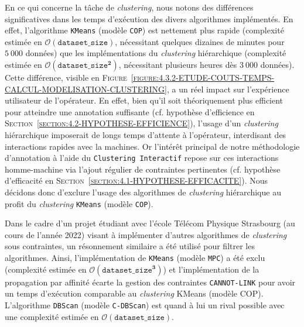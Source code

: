 			En ce qui concerne la tâche de \textit{clustering}, nous notons des différences significatives dans les temps d'exécution des divers algorithmes implémentés.
			En effet, l'algorithme \texttt{KMeans} (modèle \texttt{COP}) est nettement plus rapide (complexité estimée en $ \mathcal{O}(\texttt{dataset\_size}) $, nécessitant quelques dizaines de minutes pour $5~000$ données) que les implémentations du \textit{clustering} hiérarchique (complexité estimée en $ \mathcal{O}(\texttt{dataset\_size}^{\textbf{2}}) $, nécessitant plusieurs heures dès $3~000$ données).
			Cette différence, visible en \textsc{Figure~\ref{figure:4.3.2-ETUDE-COUTS-TEMPS-CALCUL-MODELISATION-CLUSTERING}}, a un réel impact sur l'expérience utilisateur de l'opérateur.
			En effet, bien qu'il soit théoriquement plus efficient pour atteindre une annotation suffisante (cf. hypothèse d'efficience en \textsc{Section~\ref{section:4.2-HYPOTHESE-EFFICIENCE}}), l'usage d'un \textit{clustering} hiérarchique imposerait de longs temps d'attente à l'opérateur, interdisant des interactions rapides avec la machines.
			Or l'intérêt principal de notre méthodologie d'annotation à l'aide du \texttt{Clustering Interactif} repose sur ces interactions homme-machine via l'ajout régulier de contraintes pertinentes (cf. hypothèse d'efficacité en \textsc{Section~\ref{section:4.1-HYPOTHESE-EFFICACITE}}).
			Nous décidons donc d'exclure l'usage des algorithmes de \textit{clustering} hiérarchique au profit du \textit{clustering} \texttt{KMeans} (modèle \texttt{COP}).
			
			\begin{leftBarInformation}
				Dans le cadre d'un projet étudiant avec l'école Télécom Physique Strasbourg (au cours de l'année 2022) visant à implémenter d'autres algorithmes de \textit{clustering} sous contraintes, un résonnement similaire a été utilisé pour filtrer les algorithmes.
				Ainsi, l'implémentation de \texttt{KMeans} (modèle \texttt{MPC}) a été exclu (complexité estimée en $ \mathcal{O}(\texttt{dataset\_size}^{\textbf{3}}) $) et l'implémentation de la propagation par affinité écarte la gestion des contraintes \texttt{CANNOT-LINK} pour avoir un temps d'exécution comparable au \textit{clustering} KMeans (modèle COP).
				L'algorithme \texttt{DBScan} (modèle \texttt{C-DBScan}) est quand à lui un rival possible avec une complexité estimée en $ \mathcal{O}(\texttt{dataset\_size}) $.
			\end{leftBarInformation}
			
